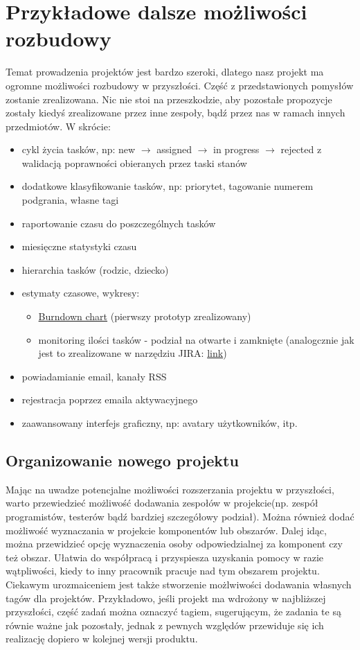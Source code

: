 \documentclass[a4paper,12pt,notitlepage]{mwrep}
\begin{document}
\section{Przykładowe dalsze możliwości rozbudowy}
Temat prowadzenia projektów jest bardzo szeroki, dlatego nasz projekt ma ogromne możliwości
rozbudowy w przyszłości. Część z przedstawionych pomysłów zostanie zrealizowana.
Nic nie stoi na przeszkodzie, aby pozostałe propozycje zostały kiedyś zrealizowane przez
inne zespoły, bądź przez nas w ramach innych przedmiotów. W skrócie:
\begin{itemize}
	\item	cykl życia tasków, np: new $\rightarrow$ assigned $\rightarrow$ in progress $\rightarrow$ rejected
			z walidacją poprawności obieranych przez taski stanów
	\item	dodatkowe klasyfikowanie tasków, np: priorytet, tagowanie numerem podgrania, własne tagi
	\item	raportowanie czasu do poszczególnych tasków
	\item	miesięczne statystyki czasu
	\item	hierarchia tasków (rodzic, dziecko)
	\item	estymaty czasowe, wykresy:
			\begin{itemize}
				\item	\href{http://www.youtube.com/watch?v=XU0llRltyFM&t=4m29s}{Burndown chart} (pierwszy prototyp zrealizowany)
				\item	monitoring ilości tasków - podział na otwarte i zamknięte (analogcznie jak jest to zrealizowane w narzędziu JIRA:
						\href{https://confluence.atlassian.com/download/attachments/185729486/gadgets-charting-created-vs-resolved.png?version=2&modificationDate=1350347163816&api=v2}{link})
			\end{itemize}
	\item	powiadamianie email, kanały RSS
	\item	rejestracja poprzez emaila aktywacyjnego
	\item	zaawansowany interfejs graficzny, np: avatary użytkowników, itp.
\end{itemize}


\subsection{Organizowanie nowego projektu}
Mając na uwadze potencjalne możliwości rozszerzania projektu w przyszłości,
warto przewiedzieć możliwość dodawania zespołów w projekcie(np. zespół programistów,
testerów bądź bardziej szczegółowy podział). Można również dodać możliwość wyznaczania
w projekcie komponentów lub obszarów. Dalej idąc, można przewidzieć opcję wyznaczenia osoby
odpowiedzialnej za komponent czy też obszar. Ułatwia do współpracą i przyspiesza uzyskania
pomocy w razie wątpliwości, kiedy to inny pracownik pracuje nad tym obszarem projektu.
Ciekawym urozmaiceniem jest także stworzenie możlwiwości dodawania własnych tagów dla projektów.
Przykładowo, jeśli projekt ma wdrożony w najbliższej przyszłości, część zadań można oznaczyć tagiem,
sugerującym, że zadania te są równie ważne jak pozostały, jednak z pewnych względów przewiduje się ich
realizację dopiero w kolejnej wersji produktu.
\end{document}
